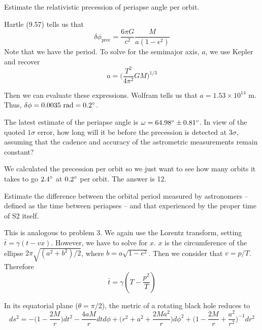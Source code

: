 \documentclass[11pt,largemargins]{homework}
\begin{document}
\begin{alphaparts}
\questionpart
Estimate the relativistic precession of periapse angle per orbit.

Hartle (9.57) tells us that 
\begin{equation}
\delta \phi_{\mathrm{prec}} = \frac{6 \pi G}{c^2} \frac{M}{a (1 - \epsilon^2)}
\end{equation}
Note that we have the period.  To solve for the semimajor axis, $a$, we use Kepler and recover
$$ a = \big(\frac{T^2}{4\pi^2} GM \big)^{1/3} $$

Then we can evaluate these expressions.  Wolfram tells us that $a = 1.53 \times 10^{14} \mbox{ m}$. Thus, $\delta \phi = 0.0035 \mbox{ rad} = 0.2 \degree$. 

\questionpart
The latest estimate of the periapse angle is $\omega = 64.98\degree \pm 0.81 \degree$.  In view of the quoted $1 \sigma$ error, how long will it be before the precession is detected at $3\sigma$, assuming that the cadence and accuracy of the astrometric measurements remain constant?

We calculated the precession per orbit so we just want to see how many orbits it takes to go $2.4 \degree$ at $0.2 \degree$ per orbit.  The answer is 12.

\questionpart
Estimate the difference between the orbital period measured by astronomers -- defined as the time between periapses -- and that experienced by the proper time of S2 itself. 

This is analogous to problem 3.  We again use the Lorentz transform, setting $\bar{t} = \gamma(t - vx)$.  However, we have to solve for $x.$  $x$ is the circumference of the ellipse $2 \pi \sqrt{(a^2 + b^2)/2}$, where $b = a \sqrt{1 -e^2}$. Then we consider that $v = p/T$.  Therefore
$$
\bar{t} = \gamma (T - \frac{p^2}{T})
$$
\end{alphaparts}

\question
In its equatorial plane ($\theta = \pi/2$), the metric of a rotating black hole reduces to
$$
ds^2 = - \Big(1 - \frac{2M}{r} \Big) dt^2 - \frac{4aM}{r}dtd\phi + \Big(r^2 + a^2 + \frac{2Ma^2}{r} \Big) d\phi^2 + \Big(1 - \frac{2M}{r} + \frac{a^2}{r^2} \Big)^{-1} dr^2
$$
\end{document}
